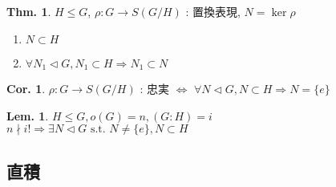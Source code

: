 \documentclass[uplatex,dvipdfmx,9pt]{beamer}
\newcommand{\nsubgroup}{\vartriangleleft} %
\newcommand{\st}{\text{ s.t. }}
\newcounter{textThmCount}
\newcounter{textLemCount}
\newcounter{textExmCount}
\theoremstyle{definition} %
\newtheorem{thmText}[textThmCount]{Thm.}
\newtheorem{corText}{Cor.}[textThmCount] %
\newtheorem{lemText}[textLemCount]{Lem.} %
\theoremstyle{example}
\begin{document}
      \begin{frame}
        
        \begin{thmText}
          $H \le G$, $\rho \colon G \to S(G/H)$ : 置換表現, $N = \ker \rho$ \\
          \begin{enumerate}
            \item $N \subset H$
            \item $\forall N_1 \nsubgroup G, N_1 \subset H \Rightarrow N_1 \subset N$
          \end{enumerate}
        \end{thmText}

        \begin{corText}
          $\rho \colon G \to S(G/H)$ : 忠実 $\Leftrightarrow$ $\forall N \nsubgroup G, N \subset H \Rightarrow N = \{e\}$
        \end{corText}

        \begin{lemText}
          $H \le G, o(G) = n, (G:H) = i$ \\
          $n \nmid i! \Rightarrow \exists N \nsubgroup G \st N \ne \{e\}, N \subset H$
        \end{lemText}

      \end{frame}

    \subsection{\textsection \thesubsection 直積}
    \setcounter{textExmCount}{0}
\end{document}
